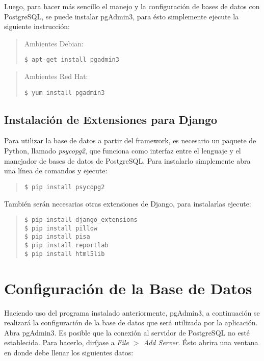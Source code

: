 \documentclass[12pt,a4paper]{article}
\begin{document}
Luego, para hacer más sencillo el manejo y la configuración de bases de datos con PostgreSQL, se puede instalar pgAdmin3, para ésto simplemente ejecute la siguiente instrucción:

\begin{quote}
Ambientes Debian:
\begin{verbatim}
$ apt-get install pgadmin3
\end{verbatim}
\end{quote}

\begin{quote}
Ambientes Red Hat:
\begin{verbatim}
$ yum install pgadmin3
\end{verbatim}
\end{quote}

\subsection{Instalación de Extensiones para Django}
Para utilizar la base de datos a partir del framework, es necesario un paquete de Python, llamado \emph{psycopg2}, que funciona como interfaz entre el lenguaje y el manejador de bases de datos de PostgreSQL. Para instalarlo simplemente abra una línea de comandos y ejecute:

\begin{quote}
\begin{verbatim}
$ pip install psycopg2
\end{verbatim}
\end{quote}

También serán necesarias otras extensiones de Django, para instalarlas ejecute:

\begin{quote}
\begin{verbatim}
$ pip install django_extensions
$ pip install pillow
$ pip install pisa
$ pip install reportlab
$ pip install html5lib
\end{verbatim}
\end{quote}

\section{Configuración de la Base de Datos}
Haciendo uso del programa instalado anteriormente, pgAdmin3, a continuación se realizará la configuración de la base de datos que será utilizada por la aplicación. \\

Abra pgAdmin3. Es posible que la conexión al servidor de PostgreSQL no esté establecida. Para hacerlo, diríjase a \emph{File $>$ Add Server}. Ésto abrira una ventana en donde debe llenar los siguientes datos:
\end{document}
